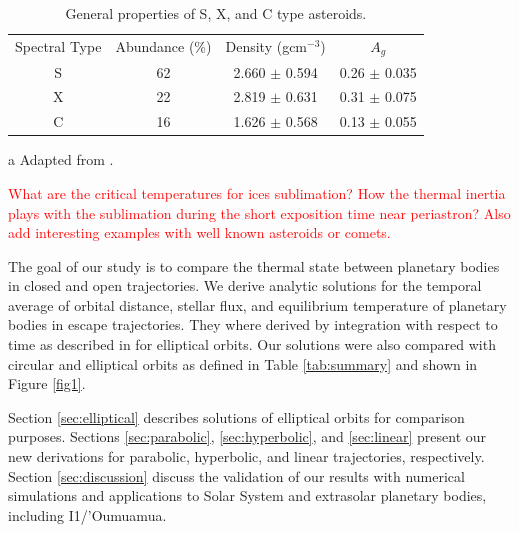\documentclass[a4paper,fleqn,usenatbib]{mnras}
\newcommand{\fix}{\textcolor{red}}
\begin{document}
\begin{table}
\begin{threeparttable}
\centering
\caption{General properties of S, X, and C type asteroids.}
\begin{tabular}{ c c c c }
 \hline
 \hline
Spectral Type & Abundance (\%) & Density (gcm$^{-3}$) & $A_g$ \\
	S & 62 & 2.660 $\pm$ 0.594 & 0.26 $\pm$ 0.035 \\
	X & 22 & 2.819 $\pm$ 0.631 & 0.31 $\pm$ 0.075 \\
	C & 16 & 1.626 $\pm$ 0.568 & 0.13 $\pm$ 0.055 \\
 \hline
 \hline
\end{tabular}
\label{tab:asteroids}
	\begin{tablenotes}
	\small
\item[a]{Adapted from \citet{2013PhDT.......424C}.}
	\end{tablenotes}
\end{threeparttable}
\end{table}

\fix{What are the critical temperatures for ices sublimation? How the thermal inertia plays with the sublimation during the short exposition time near periastron? Also add interesting examples with well known asteroids or comets.}

The goal of our study is to compare the thermal state between planetary bodies in closed and open trajectories. We derive analytic solutions for the temporal average of orbital distance, stellar flux, and equilibrium temperature of planetary bodies in escape trajectories. They where derived by integration with respect to time as described in \citet{2017ApJ...837L...1M} for elliptical orbits. Our solutions were also compared with circular and elliptical orbits as defined in Table \ref{tab:summary} and shown in Figure \ref{fig1}. 

Section \ref{sec:elliptical} describes solutions of elliptical orbits for comparison purposes. Sections \ref{sec:parabolic}, \ref{sec:hyperbolic}, and \ref{sec:linear} present our new derivations for parabolic, hyperbolic, and linear trajectories, respectively. Section \ref{sec:discussion} discuss the validation of our results with numerical simulations and applications to Solar System and extrasolar planetary bodies, including I1/'Oumuamua.
\end{document}
